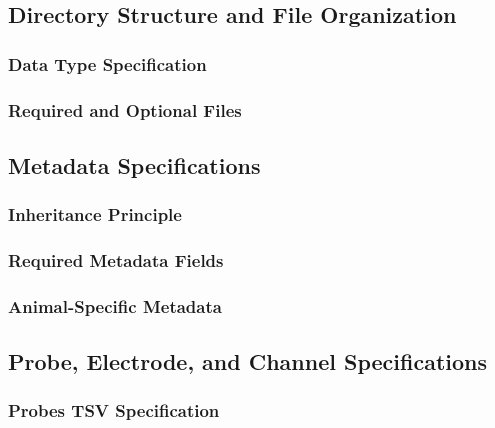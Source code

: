 \documentclass[fleqn,10pt]{wlscirep}
\begin{document}
\subsection*{Directory Structure and File Organization}

\subsubsection*{Data Type Specification}

\subsubsection*{Required and Optional Files}

\subsection*{Metadata Specifications}

\subsubsection*{Inheritance Principle}

\subsubsection*{Required Metadata Fields}

\subsubsection*{Animal-Specific Metadata}

\subsection*{Probe, Electrode, and Channel Specifications}

\subsubsection*{Probes TSV Specification}
\end{document}
